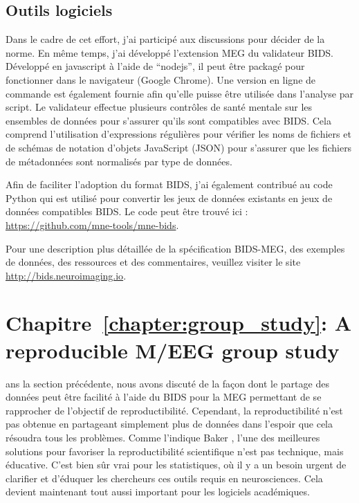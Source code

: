 \subsection*{Outils logiciels}
Dans le cadre de cet effort, j'ai participé aux discussions pour décider de la norme. En même temps, j'ai développé l'extension MEG du validateur BIDS. Développé en javascript à l'aide de “nodejs”, il peut être packagé pour fonctionner dans le navigateur (Google Chrome). Une version en ligne de commande est également fournie afin qu'elle puisse être utilisée dans l'analyse par script. Le validateur effectue plusieurs contrôles de santé mentale sur les ensembles de données pour s'assurer qu'ils sont compatibles avec BIDS. Cela comprend l'utilisation d'expressions régulières pour vérifier les noms de fichiers et de schémas de notation d'objets JavaScript (JSON) pour s'assurer que les fichiers de métadonnées sont normalisés par type de données.

Afin de faciliter l'adoption du format BIDS, j'ai également contribué au code Python qui est utilisé pour convertir les jeux de données existants en jeux de données compatibles BIDS. Le code peut être trouvé ici : \url{https://github.com/mne-tools/mne-bids}. 

Pour une description plus détaillée de la spécification BIDS-MEG, des exemples de données, des ressources et des commentaires, veuillez visiter le site \url{http://bids.neuroimaging.io}.

\section*{Chapitre~\ref{chapter:group_study}: A reproducible M/EEG group study}

ans la section précédente, nous avons discuté de la façon dont le partage des données peut être facilité à l'aide du BIDS pour la MEG permettant de se rapprocher de l'objectif de reproductibilité. Cependant, la reproductibilité n'est pas obtenue en partageant simplement plus de données dans l'espoir que cela résoudra tous les problèmes. Comme l'indique Baker \citet{baker20161}, l'une des meilleures solutions pour favoriser la reproductibilité scientifique n'est pas technique, mais éducative. C'est bien sûr vrai pour les statistiques, où il y a un besoin urgent de clarifier et d'éduquer les chercheurs ces outils requis en neurosciences. Cela devient maintenant tout aussi important pour les logiciels académiques.

